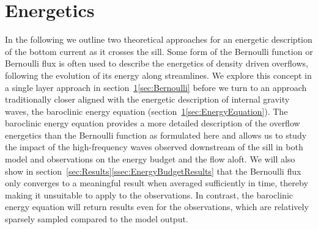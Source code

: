 \documentclass{ametsocV6.1}
\begin{document}
\section{Energetics}\label{sec:Energetics}
In the following we outline two theoretical approaches for an energetic description of the bottom current as it crosses the sill.
Some form of the Bernoulli function or Bernoulli flux is often used to describe the energetics of density driven overflows, following the evolution of its energy along streamlines.
We explore this concept in a single layer approach in section~\ref{sec:Energetics}\ref{sec:Bernoulli} before we turn to an approach traditionally closer aligned with the energetic description of internal gravity waves, the baroclinic energy equation (section~\ref{sec:Energetics}\ref{sec:EnergyEquation}).
The baroclinic energy equation provides a more detailed description of the overflow energetics than the Bernoulli function as formulated here and allows us to study the impact of the high-frequency waves observed downstream of the sill in both model and observations on the energy budget and the flow aloft.
We will also show in section~\ref{sec:Results}\ref{ssec:EnergyBudgetResults} that the Bernoulli flux only converges to a meaningful result when averaged sufficiently in time, thereby making it unsuitable to apply to the observations.
In contrast, the baroclinic energy equation will return results even for the observations, which are relatively sparsely sampled compared to the model output.
\end{document}
